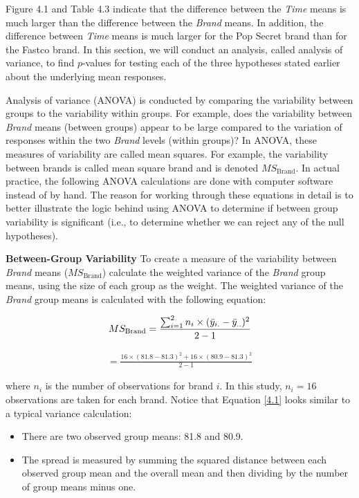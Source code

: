 \documentclass[
]{report}
\providecommand{\tightlist}{%
  \setlength{\itemsep}{0pt}\setlength{\parskip}{0pt}}
\begin{document}
Figure 4.1 and Table 4.3 indicate that the difference between the \emph{Time} means is much larger than the difference between the \emph{Brand} means. In addition, the difference between \emph{Time} means is much larger for the Pop Secret brand than for the Fastco brand. In this section, we will conduct an analysis, called analysis of variance, to find \(p\)-values for testing each of the three hypotheses stated earlier about the underlying mean responses.

Analysis of variance (ANOVA) is conducted by comparing the variability between groups to the variability within groups. For example, does the variability between \emph{Brand} means (between groups) appear to be large compared to the variation of responses within the two \emph{Brand} levels (within groups)? In ANOVA, these measures of variability are called mean squares. For example, the variability between brands is called mean square brand and is denoted \(MS_{\text{Brand}}\). In actual practice, the following ANOVA calculations are done with computer software instead of by hand. The reason for working through these equations in detail is to better illustrate the logic behind using ANOVA to determine if between group variability is significant (i.e., to determine whether we can reject any of the null hypotheses).

\textbf{Between-Group Variability} To create a measure of the variability between \emph{Brand} means (\(MS_{\text{Brand}}\)) calculate the weighted variance of the \emph{Brand} group means, using the size of each group as the weight. The weighted variance of the \emph{Brand} group means is calculated with the following equation:

\begin{align}
MS_{\text{Brand}} = \frac{\sum_{i=1}^{2} n_i \times (\bar{y}_{i.} - \bar{y}_{..})^2}{2-1}
\notag
\end{align}

\begin{align}\label{4.1}
= \frac{16 \times (81.8 - 81.3)^2 + 16 \times (80.9 - 81.3)^2}{2-1}
\tag{4.1}
\end{align}

where \(n_i\) is the number of observations for brand \(i\). In this study, \(n_i = 16\) observations are taken for each brand. Notice that Equation \ref{4.1} looks similar to a typical variance calculation:

\begin{itemize}
\tightlist
\item
  There are two observed group means: 81.8 and 80.9.
\item
  The spread is measured by summing the squared distance between each observed group mean and the overall mean and then dividing by the number of group means minus one.
\end{itemize}
\end{document}
